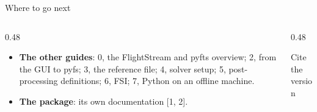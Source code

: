 \begin{frame}{Where to go next}
\begin{columns}[T]
\begin{column}{0.48\textwidth}
\begin{itemize}\small
  \item \textbf{The other guides}: 0, the FlightStream and pyfts overview;
        2, from the GUI to pyfs; 3, the reference
        file; 4, solver setup; 5, post-processing definitions; 6, FSI; 7,
        Python on an offline machine.
  \item \textbf{The package}: its own documentation [1, 2].
\end{itemize}
\end{column}
\begin{column}{0.48\textwidth}
\begin{block}{Cite the version}
\small \pkgcitation
\end{block}
\end{column}
\end{columns}
\end{frame}
